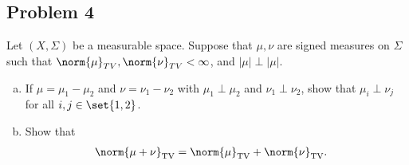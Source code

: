 \documentclass[10pt]{mypackage}
\begin{document}
\subsection{Problem 4}%
\begin{problem}
  Let $\left( X,\Sigma \right)$ be a measurable space. Suppose that $\mu,\nu$ are signed measures on $\Sigma$ such that $\norm{\mu}_{TV},\norm{\nu}_{TV} < \infty$, and $\left\vert \mu \right\vert\perp \left\vert \mu \right\vert$.
  \begin{enumerate}[(a)]
    \item If $\mu = \mu_1-\mu_2$ and $\nu = \nu_1 - \nu_2$ with $\mu_1\perp \mu_2$ and $\nu_1\perp \nu_2$, show that $\mu_i \perp \nu_j$ for all $i,j\in \set{1,2}$.
    \item Show that
      \begin{align*}
        \norm{\mu + \nu}_{\text{TV}} &= \norm{\mu}_{\text{TV}} + \norm{\nu}_{\text{TV}}.
      \end{align*}
  \end{enumerate}
\end{problem}
\end{document}
